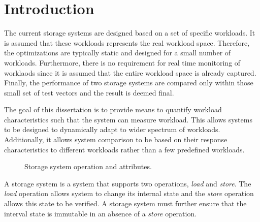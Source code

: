 \chapter{Introduction}
\label{INTRO}



The current storage systems are designed based on a set of specific workloads. 
It is assumed that these workloads represents the real workload space.
Therefore, the optimizations are typically static and designed for a small number of workloads.
Furthermore, there is no requirement for real time monitoring of worklaods since it is assumed that the entire workload space is already captured. 
Finally, the performance of two storage systems are compared only within those small set of test vectors and the result is deemed final. 


The goal of this dissertation is to provide means to quantify workload characteristics such that the system can measure workload.
This allows systems to be designed to dynamically adapt to wider spectrum of workloads.
Additionally, it allows system comparison to be based on their response characteristics to different workloads rather than a few predefined workloads. 


\begin{figure}[h]
\centering

\caption{Storage system operation and attributes.}
\label{fig:storageAttribute}
\end{figure}

A storage system is a system that supports two operations, \emph{load} and \emph{store}.
The \emph{load} operation allows system to change its internal state and the \emph{store} operation allows this state to be verified.
A storage system must further ensure that the interval state is immutable in an absence of a \emph{store} operation.

